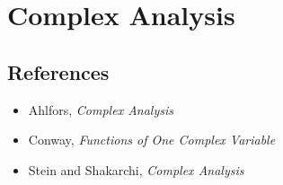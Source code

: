 \section{Complex Analysis}
\subsection*{References}
\begin{itemize}
    \item Ahlfors, \emph{Complex Analysis}
    \item Conway, \emph{Functions of One Complex Variable}
    \item Stein and Shakarchi, \emph{Complex Analysis}
\end{itemize}
